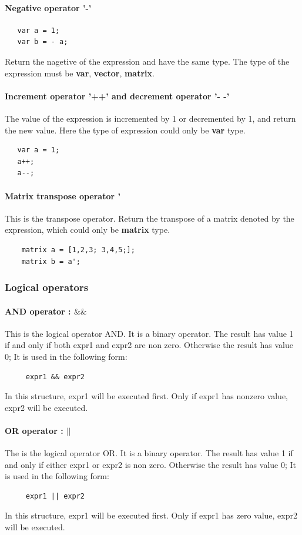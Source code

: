 \documentclass[12pt]{article} %
\begin{document}
\paragraph{Negative operator '-'}
 \begin{lstlisting}
   var a = 1;
   var b = - a;
\end{lstlisting}
Return the nagetive of the expression and have the same type. The type of the expression must be \textbf{var}, \textbf{vector}, \textbf{matrix}.
\paragraph{ Increment operator '++' and decrement operator '- -'}
The value of the expression is incremented by 1 or decremented by 1, and return the new value. Here the type of expression could only be \textbf{var} type.
 \begin{lstlisting}
   var a = 1;
   a++; 
   a--;
\end{lstlisting}
\paragraph{Matrix transpose operator  '}
This is the transpose operator. Return the transpose of a matrix denoted by the expression, which could only be \textbf{matrix} type.
 \begin{lstlisting}
    matrix a = [1,2,3; 3,4,5;];
    matrix b = a';
\end{lstlisting}
\subsubsection{Logical operators}
\paragraph{AND operator :  $\&\&$ }
This is the logical operator AND.  It is a binary  operator. The result has value 1 if and only if both expr1 and expr2 are non zero. Otherwise the result has value 0;  It is used in the following form:
\begin{lstlisting}
     expr1 && expr2 
\end{lstlisting}
In this structure, expr1 will be executed first. Only if expr1 has nonzero value, expr2 will be executed.
\paragraph{OR operator : $||$ }
The is the logical operator OR.  It is a binary operator. The result has value 1 if and only if either expr1 or expr2  is non zero. Otherwise the result has value 0; It is used in the following form:
\begin{lstlisting}
     expr1 || expr2 
\end{lstlisting}
In this structure, expr1 will be executed first. Only if expr1 has  zero value, expr2 will be executed.
\end{document}
